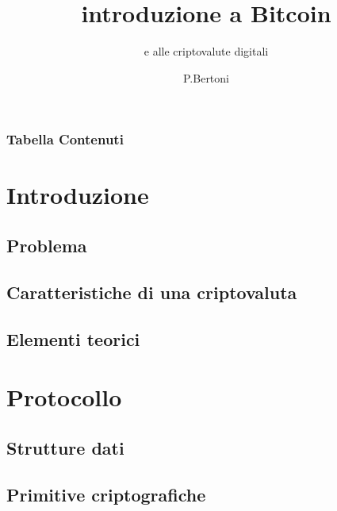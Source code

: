 \documentclass{beamer}
\title{introduzione a Bitcoin}
\subtitle{e alle criptovalute digitali}
\author{P.Bertoni}
\begin{document}
\begin{frame}
	\titlepage
\end{frame}
\begin{frame}
	\frametitle{Tabella Contenuti}
	\tableofcontents
\end{frame}
\section{Introduzione}
\subsection{Problema} %
	
	
	
\subsection{Caratteristiche di una criptovaluta}
	
	
\subsection{Elementi teorici}
	
	
	
\section{Protocollo}
\subsection{Strutture dati}
	
	
	
	
	
	
\subsection{Primitive criptografiche} %
	
	
\end{document}
